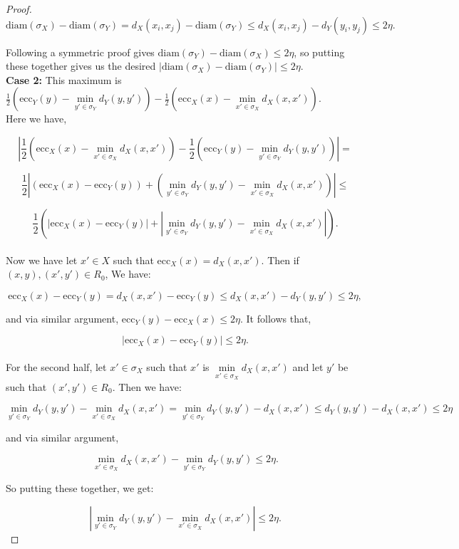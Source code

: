 \documentclass[a4paper,12pt,reqno, english]{amsart}
\newcommand{\diam}{\mathrm{diam}}
\newcommand{\ecc}{\mathrm{ecc}}
\theoremstyle{plain}
\theoremstyle{definition}
\begin{document}
\begin{proof}
$$\diam(\sigma_X)-\diam(\sigma_Y) = d_X(x_i,x_j) - \diam(\sigma_Y) \leq d_X(x_i,x_j) - d_Y(y_i,y_j) \leq 2\eta.$$

Following a symmetric proof gives $\diam(\sigma_Y)-\diam(\sigma_X) \leq 2\eta$, so putting these together gives us the desired $|\diam(\sigma_X)-\diam(\sigma_Y)|\leq 2\eta$.\\

\textbf{Case 2:} This maximum is $\frac{1}{2}(\ecc_Y(y)-\min\limits_{y'\in \sigma_Y}d_Y(y,y')) - \frac{1}{2}(\ecc_X(x)-\min\limits_{x'\in \sigma_X}d_X(x,x')).$\\
Here we have,

$$\left|\frac{1}{2}\left(\ecc_X(x)-\min\limits_{x'\in \sigma_X}d_X(x,x')\right) - \frac{1}{2}\left(\ecc_Y(y)-\min\limits_{y'\in \sigma_Y}d_Y(y,y')\right)\right| =$$

$$\frac{1}{2}\left|(\ecc_X(x)-\ecc_Y(y)) + \left(\min\limits_{y'\in \sigma_Y}d_Y(y,y') - \min\limits_{x'\in \sigma_X}d_X(x,x')\right)\right| \leq$$

$$\frac{1}{2}\left(\left|\ecc_X(x)-\ecc_Y(y)\right| + \left|\min\limits_{y'\in \sigma_Y}d_Y(y,y') - \min\limits_{x'\in \sigma_X}d_X(x,x')\right|\right).$$\\

Now we have let $x'\in X$ such that $\ecc_X(x) = d_X(x,x')$. Then if $(x,y),(x',y')\in R_0$, We have:

$$\ecc_X(x)-\ecc_Y(y) = d_X(x,x') - \ecc_Y(y) \leq d_X(x,x')-d_Y(y,y') \leq 2\eta,$$

and via similar argument, $\ecc_Y(y)-\ecc_X(x) \leq 2\eta$. It follows that, 

$$|\ecc_X(x) - \ecc_Y(y)|\leq 2\eta.$$\\

For the second half, let $x'\in \sigma_X$ such that $x'$ is $\min\limits_{x'\in \sigma_X}d_X(x,x')$ and let $y'$ be such that $(x',y')\in R_0$. Then we have:

$$\min_{y'\in \sigma_Y}d_Y(y,y') - \min_{x'\in \sigma_X}d_X(x,x') = \min_{y'\in \sigma_Y}d_Y(y,y') - d_X(x,x') \leq d_Y(y,y') - d_X(x,x') \leq 2\eta$$

and via similar argument, 

$$\min_{x'\in \sigma_X}d_X(x,x')-\min_{y'\in \sigma_Y}d_Y(y,y') \leq 2\eta.$$

So putting these together, we get:



$$\left|\min_{y'\in \sigma_Y}d_Y(y,y') - \min_{x'\in \sigma_X}d_X(x,x')\right|\leq 2\eta.$$


\end{proof}
\end{document}
